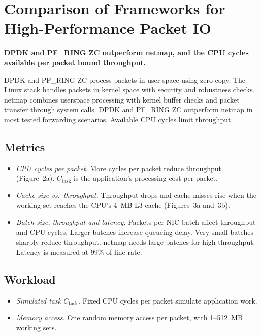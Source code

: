 \documentclass[11pt,a4paper]{article}
\newcommand{\finding}[1]{\textbf{#1}\par\smallskip}
\begin{document}
\null %
\clearpage

\begingroup
\small
\section*{\large\normalfont Comparison of Frameworks for High-Performance Packet IO~\cite{gallenmueller2015}}
\finding{DPDK and PF\_RING ZC outperform netmap, and the CPU cycles available per packet bound throughput.}
DPDK and PF\_RING ZC process packets in user space using zero-copy.
The Linux stack handles packets in kernel space with security and robustness checks.
netmap combines userspace processing with kernel buffer checks and packet transfer through system calls.
DPDK and PF\_RING ZC outperform netmap in most tested forwarding scenarios.
Available CPU cycles limit throughput.

\subsection*{\normalsize\normalfont Metrics}
\begin{itemize}
\setlength{\itemsep}{2pt}
\item \emph{CPU cycles per packet.}
More cycles per packet reduce throughput (Figure~2a).
$C_{\mathrm{task}}$ is the application's processing cost per packet.

\item \emph{Cache size vs.\ throughput.}
Throughput drops and cache misses rise when the working set reaches the CPU's 4~MB L3 cache (Figures~3a and~3b).

\item \emph{Batch size, throughput and latency.}
Packets per NIC batch affect throughput and CPU cycles.
Larger batches increase queueing delay.
Very small batches sharply reduce throughput.
netmap needs large batches for high throughput.
Latency is measured at 99\% of line rate.
\end{itemize}

\subsection*{\normalsize\normalfont Workload}
\begin{itemize}
\setlength{\itemsep}{2pt}
\item \emph{Simulated task $C_{\mathrm{task}}$.}
Fixed CPU cycles per packet simulate application work.
\item \emph{Memory access.}
One random memory access per packet, with 1--512~MB working sets.
\end{itemize}
\end{document}
